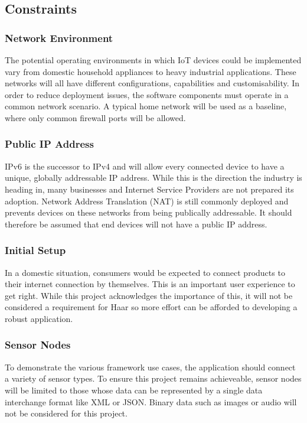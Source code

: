     \subsection{Constraints}
      \subsubsection{Network Environment}
        The potential operating environments in which IoT devices could be implemented vary from domestic household appliances to heavy industrial applications. These networks will all have different configurations, capabilities and customisability. In order to reduce deployment issues, the software components must operate in a common network scenario. A typical home network will be used as a baseline, where only common firewall ports will be allowed.

      \subsubsection{Public IP Address}
        IPv6 is the successor to IPv4 and will allow every connected device to have a unique, globally addressable IP address. While this is the direction the industry is heading in, many businesses and Internet Service Providers are not prepared its adoption. Network Address Translation (NAT) is still commonly deployed and prevents devices on these networks from being publically addressable. It should therefore be assumed that end devices will not have a public IP address.

      \subsubsection{Initial Setup}
        In a domestic situation, consumers would be expected to connect products to their internet connection by themselves. This is an important user experience to get right. While this project acknowledges the importance of this, it will not be considered a requirement for Haar so more effort can be afforded to developing a robust application.

      \subsubsection{Sensor Nodes}
        To demonstrate the various framework use cases, the application should connect a variety of sensor types. To ensure this project remains achieveable, sensor nodes will be limited to those whose data can be represented by a single data interchange format like XML or JSON. Binary data such as images or audio will not be considered for this project.

